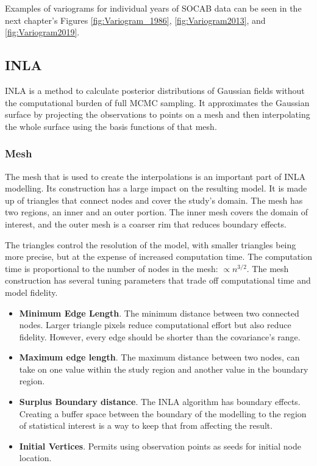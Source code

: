 \documentclass{article}
\begin{document}
	Examples of variograms for individual years of \ac{SOCAB} data can be seen in the next chapter's Figures \ref{fig:Variogram_1986}, \ref{fig:Variogram2013}, and \ref{fig:Variogram2019}.
	
	
	\subsection{INLA}
	\label{subsec:inla}
	\ac{INLA} is a method to calculate posterior distributions of Gaussian fields without the computational burden of full \ac{MCMC} sampling. It approximates the Gaussian surface by projecting the observations to points on a mesh and then interpolating the whole surface using the basis functions of that mesh.
	
	\subsubsection*{Mesh} \label{subsec:IntroMesh}
	The mesh that is used to create the interpolations is an important part of \ac{INLA} modelling.  Its construction has a large impact on the resulting model.  It is made up of triangles that connect nodes and cover the study's domain.
	The mesh has two regions, an inner and an outer portion.  The inner mesh covers the domain of interest, and the outer mesh is a coarser rim that reduces boundary effects.  
	
	The triangles control the resolution of the model, with smaller triangles being more precise, but at the expense of increased computation time.  The computation time is proportional to the number of nodes in the mesh: $\propto n^{3/2}$.  The mesh construction has several tuning parameters that trade off computational time and model fidelity.
	
	\begin{itemize}
		\item \textbf{Minimum Edge Length}.  The minimum distance between two connected nodes. Larger triangle pixels reduce computational effort but also reduce fidelity.  However, every edge should be shorter than the covariance's range.
		\item \textbf{Maximum edge length}.  The maximum distance between two nodes, can take on one value within the study region and another value in the boundary region. 
		\item \textbf{Surplus Boundary distance}.  The \ac{INLA} algorithm has boundary effects.  Creating a buffer space between the boundary of the modelling to the region of statistical interest is a way to keep that from affecting the result.
		\item \textbf{Initial Vertices}. Permits using observation points as seeds for initial node location.
	\end{itemize}
	
\end{document}
